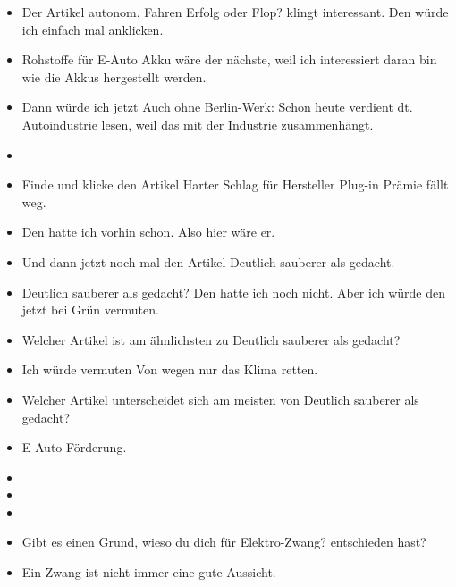{\begin{itemize}[]
                  Wenn ich jetzt nämlich schon in dieser Staat-Kategorie bin, dann würde ich da jetzt auch mehr zu lesen wollen.
            \item {} Der Artikel \flqq autonom. Fahren Erfolg oder Flop?\frqq{} klingt interessant.
                  Den würde ich einfach mal anklicken.
            \item {} \flqq Rohstoffe für E-Auto Akku\frqq{} wäre der nächste, weil ich interessiert daran bin wie die Akkus hergestellt werden.
            \item {} Dann würde ich jetzt \flqq Auch ohne Berlin-Werk: Schon heute verdient dt. Autoindustrie\frqq{} lesen, weil das mit der Industrie zusammenhängt.
            \item {}
            \item {} Finde und klicke den Artikel \flqq Harter Schlag für Hersteller Plug-in Prämie fällt weg\frqq{}.
            \item {} Den hatte ich vorhin schon. Also hier wäre er.
            \item {} Und dann jetzt noch mal den Artikel \flqq Deutlich sauberer als gedacht\frqq{}.
            \item {} \flqq Deutlich sauberer als gedacht\frqq{}?
                  Den hatte ich noch nicht.
                  Aber ich würde den jetzt bei Grün vermuten.
            \item {} Welcher Artikel ist am ähnlichsten zu \flqq Deutlich sauberer als gedacht\frqq{}?
            \item {} Ich würde vermuten \flqq Von wegen nur das Klima retten\frqq{}.
            \item {} Welcher Artikel unterscheidet sich am meisten von \flqq Deutlich sauberer als gedacht\frqq{}?
            \item {} \flqq E-Auto Förderung\frqq{}.
            \item {}
            \item {}
            \item {}
            \item {} Gibt es einen Grund, wieso du dich für \flqq Elektro-Zwang?\frqq{} entschieden hast?
            \item {} Ein Zwang ist nicht immer eine gute Aussicht.

\end{itemize}}
